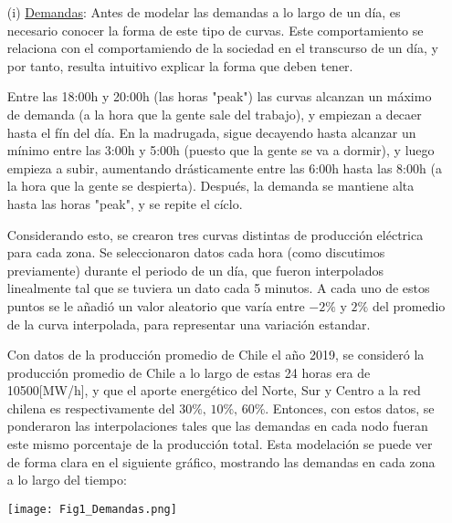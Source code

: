 \documentclass[12pt,twoside]{article}
\begin{document}
	\begin{itemize}
		\item [(i)] \underline{Demandas}: Antes de modelar las demandas a lo largo de un d\'ia, es necesario conocer la forma de este tipo de curvas. Este comportamiento se relaciona con el comportamiendo de la sociedad en el transcurso de un d\'ia, y por tanto, resulta intuitivo explicar la forma que deben tener.
		
		 \hspace{1cm} Entre las 18:00h y 20:00h (las horas "peak") las curvas alcanzan un m\'aximo de demanda (a la hora que la gente sale del trabajo), y empiezan a decaer hasta el f\'in del d\'ia. En la madrugada, sigue decayendo hasta alcanzar un m\'inimo entre las 3:00h y 5:00h (puesto que la gente se va a dormir), y luego empieza a subir, aumentando dr\'asticamente entre las 6:00h hasta las 8:00h (a la hora que la gente se despierta). Despu\'es, la demanda se mantiene alta hasta las horas "peak", y se repite el c\'iclo.
		
		 \hspace{1cm} Considerando esto, se crearon tres curvas distintas de producci\'on el\'ectrica para cada zona. Se seleccionaron datos cada hora (como discutimos previamente) durante el periodo de un d\'ia, que fueron interpolados linealmente tal que se tuviera un dato cada 5 minutos. A cada uno de estos puntos se le a\~{n}adi\'o un valor aleatorio que var\'ia entre \(-2\%\) y \(2\%\) del promedio de la curva interpolada, para representar una variaci\'on estandar.
		
		\hspace{1cm} Con datos de la producci\'on promedio de Chile el a\~{n}o 2019, se consider\'o la producci\'on promedio de Chile a lo largo de estas 24 horas era de 10500[MW/h], y que el aporte energ\'etico del Norte, Sur y Centro a la red chilena es respectivamente del \(30\%,\,10\%,\,60\%\). Entonces, con estos datos, se ponderaron las interpolaciones tales que las demandas en cada nodo fueran este mismo porcentaje de la producci\'on total. Esta modelaci\'on se puede ver de forma clara en el siguiente gr\'afico, mostrando las demandas en cada zona a lo largo del tiempo:
		
		\begin{center}
			\texttt{[image: Fig1\_Demandas.png]}
		\end{center}
		

\end{itemize}
\end{document}
